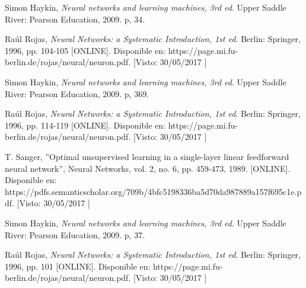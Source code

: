 \documentclass[11pt,spanish,answers]{exam}
\begin{document}
\begin{thebibliography}{1}

    Simon Haykin,
    \textit{Neural networks and learning machines, 3rd ed}. 
    Upper Saddle River: Pearson Education, 2009. p, 34.

    Raúl Rojas,
    \textit{Neural Networks: a Systematic Introduction, 1st ed}. 
    Berlin: Springer, 1996, pp. 104-105 [ONLINE]. Disponible en: https://page.mi.fu-berlin.de/rojas/neural/neuron.pdf. [Visto: 30/05/2017 ]

    Simon Haykin,
    \textit{Neural networks and learning machines, 3rd ed}. 
    Upper Saddle River: Pearson Education, 2009. p, 369.

    Raúl Rojas,
    \textit{Neural Networks: a Systematic Introduction, 1st ed}. 
    Berlin: Springer, 1996, pp. 114-119 [ONLINE]. Disponible en: https://page.mi.fu-berlin.de/rojas/neural/neuron.pdf. [Visto: 30/05/2017 ]


    T. Sanger,
    ''Optimal unsupervised learning in a single-layer linear feedforward neural network'', Neural Networks, vol. 2, no. 6, pp. 459-473, 1989. [ONLINE]. Disponible en: https://pdfs.semanticscholar.org/709b/4bfc5198336ba5d70da987889a157f695c1e.pdf. [Visto: 30/05/2017 ]

    Simon Haykin,
    \textit{Neural networks and learning machines, 3rd ed}. 
    Upper Saddle River: Pearson Education, 2009. p, 37.

    Raúl Rojas,
    \textit{Neural Networks: a Systematic Introduction, 1st ed}. 
    Berlin: Springer, 1996, pp. 101 [ONLINE]. Disponible en: https://page.mi.fu-berlin.de/rojas/neural/neuron.pdf. [Visto: 30/05/2017 ]

\end{thebibliography}
\end{document}
